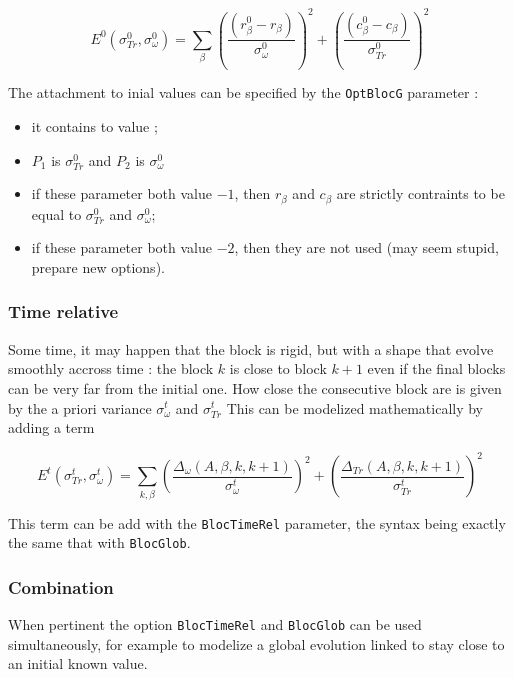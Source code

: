 \begin{equation}
      E^0(\sigma^0_{Tr},\sigma^0_{\omega}) =
      \sum _{\beta}
      (\frac{(r^0_\beta-r_\beta)}{\sigma^0_{\omega}}) ^2
       +(\frac{(c^0_\beta-c_\beta)}{\sigma^0 _{Tr}})^2
\end{equation}

The attachment to inial values can be specified by the {\tt OptBlocG} parameter :

\begin{itemize}
    \item  it contains to value ;
    \item  $P_1$ is $\sigma^0 _{Tr}$ and $P_2$ is $\sigma^0 _{\omega}$
    \item  if these parameter both value $-1$, then  $r_\beta$ and $c_\beta$ are
           strictly contraints to be equal to $\sigma^0_{Tr} $ and $\sigma^0_{\omega} $;
    \item  if these parameter both value $-2$,  then they are not used (may seem stupid, prepare new options).
\end{itemize}

\subsubsection{Time relative }

Some time, it may happen that the block is rigid, but with a shape that evolve smoothly accross time :
the block $k$ is close to block $k+1$ even if the final blocks can be very far from the initial one.
How close the consecutive block are is given by the a priori variance $\sigma^t_{\omega}$ and $\sigma^t_{Tr}$ 
This can be modelized mathematically by adding a term

\begin{equation}
      E^{t}(\sigma^t_{Tr},\sigma^t_{\omega}) =
      \sum _{k,\beta}
      (\frac{\Delta_{\omega}(A,\beta,k,k+1)}{\sigma^t_{\omega}}) ^2
      +(\frac{\Delta_{Tr}(A,\beta,k,k+1)}{\sigma^t_{Tr}})^2
\end{equation}

This term can be add with the {\tt BlocTimeRel} parameter, the syntax being exactly the same that 
with {\tt BlocGlob}.

\subsubsection{Combination}

When pertinent the option  {\tt BlocTimeRel} and {\tt BlocGlob} can be used 
simultaneously, for example to modelize a global evolution linked to stay close
to an initial known value.






